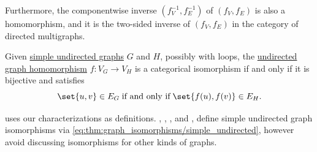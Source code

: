 \begin{proposition}
\begin{thmenum}
    Furthermore, the componentwise inverse \( (f_V^{-1}, f_E^{-1}) \) of \( (f_V, f_E) \) is also a homomorphism, and it is the two-sided inverse of \( (f_V, f_E) \) in the category of directed multigraphs.

     Given \hyperref[def:undirected_graph]{simple undirected graphs} \( G \) and \( H \), possibly with loops, the \hyperref[def:undirected_graph/homomorphism]{undirected graph homomorphism} \( f: V_G \to V_H \) is a categorical isomorphism if and only if it is bijective and satisfies
    \begin{equation}\label{eq:thm:graph_isomorphisms/simple_undirected}
      \set{ u, v } \in E_G \T{if and only if} \set{ f(u), f(v) } \in E_H.
    \end{equation}
  \end{thmenum}
\end{proposition}
\begin{comments}
  \item {} uses our characterizations as definitions. , , ,  and ,  define simple undirected graph isomorphisms via \eqref{eq:thm:graph_isomorphisms/simple_undirected}, however avoid discussing isomorphisms for other kinds of graphs.
\end{comments}
